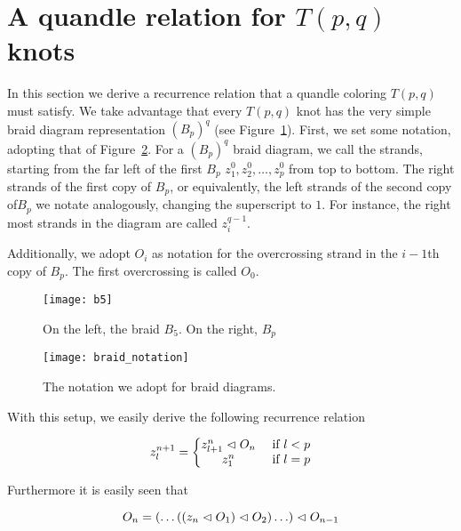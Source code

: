 \documentclass[paper.tex]{subfiles}
\begin{document}
\section{A quandle relation for $T(p,q)$ knots}

In this section we derive a recurrence relation that a quandle coloring $T(p,q)$ must satisfy. We take advantage that every $T(p,q)$ knot has the very simple braid diagram representation $(B_p)^q$ (see Figure~\ref{fig:bp}). First,
we set some notation, adopting that of Figure~\ref{fig:braid_notation}. For a $(B_p)^q$ braid diagram, we call the strands, starting from the far left of the first $B_p$ $z^0_1, z^0_2, \ldots, z^0_p$ from top to bottom.
The right strands of the first copy of $B_p$, or equivalently, the left strands of the second copy of$B_p$ we notate analogously, changing the superscript to $1$. For instance, the right most strands in the diagram are called $z^{q - 1}_i$.

Additionally, we adopt $O_i$ as notation for the overcrossing strand in the $i - 1$th copy of $B_p$. The first overcrossing is called $O_0$.

\begin{figure}[h]
  \centering
  \texttt{[image: b5]}
  \caption{On the left, the braid $B_5$. On the right, $B_p$}\label{fig:bp}
\end{figure}

\begin{figure}[h]
   \centering
   \texttt{[image: braid\_notation]}
   \caption{The notation we adopt for braid diagrams.}\label{fig:braid_notation}
\end{figure}

With this setup, we easily derive the following recurrence relation

\begin{equation}
   \label{eq:pq_recurrence}
   z^{n+1}_l = \left\{
   \begin{matrix}
        z^n_{l+1} \vartriangleleft O_n &\text{ if } l < p \\
        z^n_1 &\text{ if } l = p
   \end{matrix}
   \right.
\end{equation}

Furthermore it is easily seen that

\begin{equation}
   O_n = (\ldots((z_n \vartriangleleft O_1) \vartriangleleft O_2) \ldots ) \vartriangleleft O_{n-1}
\end{equation}
\end{document}
